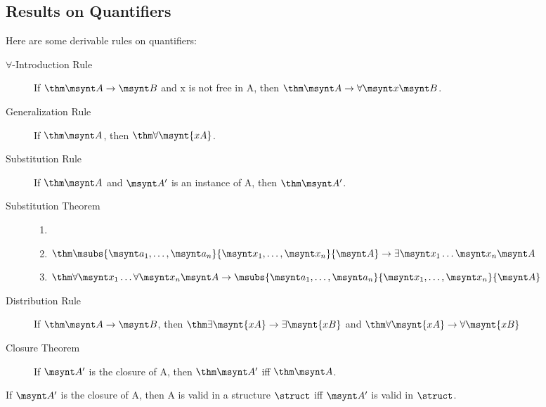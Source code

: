 \subsection{Results on Quantifiers}

\begin{fact}
	Here are some derivable rules on quantifiers:
	\begin{description}
		\item[$\forall$-Introduction Rule] If $\thm \msynt A \to \msynt B$ and
		\synt x is not free in \synt A, then $\thm \msynt A \to \forall \msynt x \msynt B$.
		\item[Generalization Rule] If $\thm \msynt A$, then $\thm \forall \msynt{xA}$.
		\item[Substitution Rule] If $\thm \msynt A$ and $\msynt A'$ is an instance
		of \synt A, then $\thm \msynt A'$.
		\item[Substitution Theorem] 
		\begin{enumerate}
			\item[]
			\item $\thm \msubs{\msynt a_1,\dots,\msynt a_n}{\msynt x_1,\dots,\msynt x_n}{\msynt A}\to
			\exists \msynt x_1\dots\msynt x_n\msynt A$
			\item $\thm \forall \msynt x_1\dots\forall\msynt x_n\msynt A\to
			\msubs{\msynt a_1,\dots,\msynt a_n}{\msynt x_1,\dots,\msynt x_n}{\msynt A}$	
		\end{enumerate}
		\item[Distribution Rule] If $\thm \msynt A \to \msynt B$, then
		$\thm \exists \msynt{xA}\to\exists\msynt{xB}$ and
		$\thm \forall \msynt{xA}\to\forall\msynt{xB}$
		\item[Closure Theorem] If $\msynt A'$ is the closure of \synt A, then 
		$\thm \msynt A'$ iff $\thm \msynt A$.
	\end{description}
\end{fact}

\begin{corollary}
	If $\msynt A'$ is the closure of \synt A, then \synt A is valid in a
	structure $\struct$ iff $\msynt A'$ is valid in $\struct$.
\end{corollary}